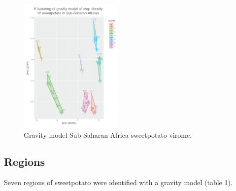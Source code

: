 \documentclass{article}
\begin{document}
\begin{figure}[h!]
\begin{center}
\includegraphics[width=0.45\textwidth]{../images/SSA-SPV-kcluster-1gamma-2_deg_1e-06_gap_statsMC1000} %
\caption{Gravity model Sub-Saharan Africa sweetpotato virome.}
\end{center}
\end{figure}



\subsection{Regions}
\label{Sweetpotato regions}
Seven regions of sweetpotato were identified with a gravity model (table 1).
\end{document}
